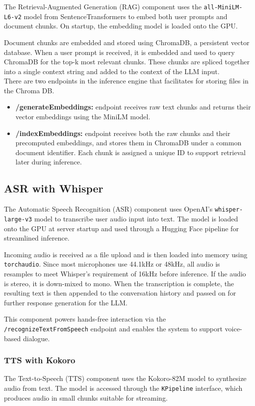 \documentclass[twocolumn]{article}
\begin{document}
The Retrieval-Augmented Generation (RAG) component uses the \texttt{all-MiniLM-L6-v2} model from SentenceTransformers to embed both user prompts and document chunks. On startup, the embedding model is loaded onto the GPU.

Document chunks are embedded and stored using ChromaDB\cite{chromadb2023}, a persistent vector database. When a user prompt is received, it is embedded and used to query ChromaDB for the top-k most relevant chunks. These chunks are spliced together into a single context string and added to the context of the LLM input.\\
There are two endpoints in the inference engine that facilitates for storing files in the Chroma DB.
\begin{itemize}
    \item \textbf{/generateEmbeddings:} endpoint receives raw text chunks and returns their vector embeddings using the MiniLM model.
    \item \textbf{/indexEmbeddings:} endpoint receives both the raw chunks and their precomputed embeddings, and stores them in ChromaDB under a common document identifier. Each chunk is assigned a unique ID to support retrieval later during inference.
\end{itemize}

\subsection{ASR with Whisper}
The Automatic Speech Recognition (ASR) component uses OpenAI’s \texttt{whisper-large-v3}\cite{radford2022whisper} model to transcribe user audio input into text. The model is loaded onto the GPU at server startup and used through a Hugging Face pipeline for streamlined inference.

Incoming audio is received as a file upload and is then loaded into memory using \texttt{torchaudio}\cite{torchaudio}. Since most microphones use 44.1kHz or 48kHz, all audio is resamples to meet Whisper's requirement of 16kHz before inference. If the audio is stereo, it is down-mixed to mono. When the transcription is complete, the resulting text is then appended to the conversation history and passed on for further response generation for the LLM.

This component powers hands-free interaction via the \texttt{/recognizeTextFromSpeech} endpoint and enables the system to support voice-based dialogue.

\subsubsection{TTS with Kokoro}
The Text-to-Speech (TTS) component uses the Kokoro-82M model\cite{kokoro82m} to synthesize audio from text. The model is accessed through the \texttt{KPipeline} interface, which produces audio in small chunks suitable for streaming.
\end{document}
